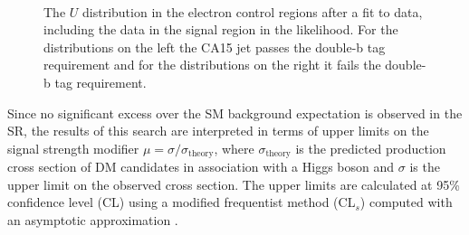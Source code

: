 \begin{figure}
  \\
\caption{The $U$ distribution in the electron control regions after a fit to data, including the data in the signal region in the likelihood. For the distributions on the left the CA15 jet passes the double-b tag requirement and for the distributions on the right it fails the double-b tag requirement.}
\label{Fig_cr_2}
\end{figure}

Since no significant excess over the SM background expectation is observed in the SR, the results of this search are interpreted in terms of upper limits on the signal strength modifier $\mu=\sigma/\sigma_\text{theory}$, where $\sigma_\text{theory}$ is the predicted production cross 
section of DM candidates in association with a Higgs boson and $\sigma$ is the upper limit on the observed cross section. 
The upper limits are calculated at 95\% confidence level (CL) using a modified frequentist method (CL$_s$) \cite{yellowReport, bib:CLS1, bib:CLS2} computed with an asymptotic approximation \cite{bib:CLS3}. 


